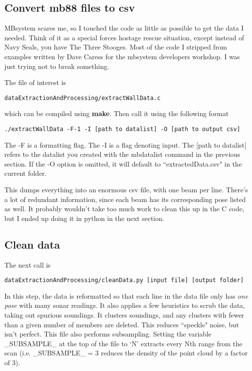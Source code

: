 \documentclass[12pt]{amsart}
\begin{document}
\subsection{Convert mb88 files to csv}

MBsystem scares me, so I touched the code as little as possible to get the data I needed. Think of it as a special forces hostage rescue situation, except instead of Navy Seals, you have The Three Stooges. Most of the code I stripped from examples written by Dave Caress for the mbsystem developers workshop. I was just trying not to break something. 

The file of interest is 
\begin{lstlisting}
dataExtractionAndProcessing/extractWallData.c
\end{lstlisting}
which can be compiled using \textbf{make}.
\vspace{12pt}
Then call it using the following format
\begin{small}
\begin{lstlisting}
./extractWallData -F-1 -I [path to datalist] -O [path to output csv]
\end{lstlisting}
\end{small}
The -F is a formatting flag. The -I is a flag denoting input. The [path to datalist] refers to the datalist you created with the mbdatalist command in the previous section. If the -O option is omitted, it will default to ``extractedData.csv" in the current folder.

This dumps everything into an enormous csv file, with one beam per line. There's a lot of redundant information, since each beam has its corresponding pose listed as well. It probably wouldn't take too much work to clean this up in the C code, but I ended up doing it in python in the next section.  

\subsection{Clean data}
The next call is 
\begin{lstlisting}
dataExtractionAndProcessing/cleanData.py [input file] [output folder]
\end{lstlisting}

In this step, the data is reformatted so that each line in the data file only has \emph{one pose} with many sonar readings. It also applies a few heuristics to scrub the data, taking out spurious soundings. It clusters soundings, and any clusters with fewer than a given number of members are deleted. This reduces ``speckle" noise, but isn't perfect. This file also performs subsampling. Setting the variable \_SUBSAMPLE\_ at the top of the file to `N' extracts every Nth range from the scan (i.e. \_SUBSAMPLE\_ = 3 reduces the density of the point cloud by a factor of 3).
\end{document}
